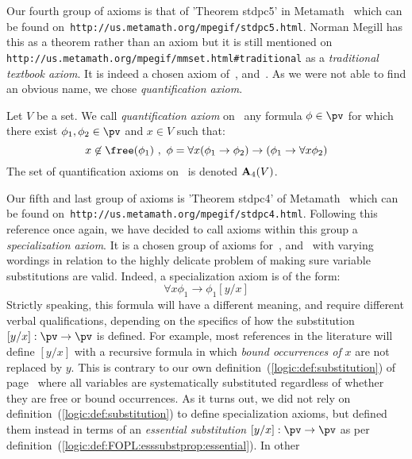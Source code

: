 Our fourth group of axioms is that of 'Theorem stdpc5' in
Metamath~\cite{Metamath} which can be found
on~\texttt{http://us.metamath.org/mpegif/stdpc5.html}. Norman Megill
has this as a theorem rather than an axiom but it is still mentioned
on \texttt{http://us.metamath.org/mpegif/mmset.html\#traditional} as
a {\em traditional textbook axiom}. It is indeed a chosen axiom
of~\cite{AlgLog}, \cite{Ferenczi} and~\cite{Johnstone}. As we were
not able to find an obvious name, we chose {\em quantification
axiom}.
\begin{defin}\label{logic:def:FOPL:quantification:axiom}
Let $V$ be a set. We call {\em quantification axiom} on \pv\ any
formula $\phi\in\pv$ for which there exist $\phi_{1},\phi_{2}\in\pv$
and $x\in V$ such that:
    \[
    x\not\in\free(\phi_{1})\ ,\ \phi =\forall x(\phi_{1}\to\phi_{2})\to(\phi_{1}
    \to\forall x \phi_{2})
    \]
The set of quantification axioms on \pv\ is denoted ${\bf
A}_{4}(V)$.
\end{defin}
Our fifth and last group of axioms is 'Theorem stdpc4' of
Metamath~\cite{Metamath} which can be found
on~\texttt{http://us.metamath.org/mpegif/stdpc4.html}. Following
this reference once again, we have decided to call axioms within
this group a {\em specialization axiom}. It is a chosen group of
axioms for~\cite{AlgLog}, \cite{Ferenczi} and~\cite{Johnstone} with
varying wordings in relation to the highly delicate problem of
making sure variable substitutions are valid. Indeed, a
specialization axiom is of the form:
    \begin{equation}\label{logic:eqn:FOPL:axioms:specialization:eqn1}
    \forall x\phi_{1}\to\phi_{1}[y/x]
    \end{equation}
Strictly speaking, this formula will have a different meaning, and
require different verbal qualifications, depending on the specifics
of how the substitution $[y/x]:\pv\to\pv$ is defined. For example,
most references in the literature will define $[y/x]$ with a
recursive formula in which {\em bound occurrences of} $x$ are not
replaced by $y$. This is contrary to our own
definition~(\ref{logic:def:substitution}) of
page~\pageref{logic:def:substitution} where all variables are
systematically substituted regardless of whether they are free or
bound occurrences. As it turns out, we did not rely on
definition~(\ref{logic:def:substitution}) to define specialization
axioms, but defined them instead in terms of an {\em essential
substitution} $[y/x]:\pv\to\pv$ as per
definition~(\ref{logic:def:FOPL:esssubstprop:essential}). In other
